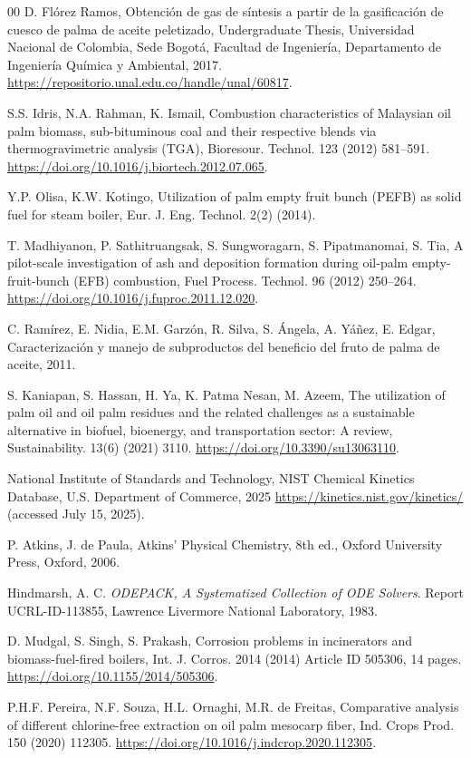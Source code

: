 \documentclass[preprint,12pt]{elsarticle}
\begin{document}
\begin{thebibliography}{00}
 D. Flórez Ramos, Obtención de gas de síntesis a partir de la gasificación de cuesco de palma de aceite peletizado, Undergraduate Thesis, Universidad Nacional de Colombia, Sede Bogotá, Facultad de Ingeniería, Departamento de Ingeniería Química y Ambiental, 2017. \url{https://repositorio.unal.edu.co/handle/unal/60817}.

 S.S. Idris, N.A. Rahman, K. Ismail, Combustion characteristics of Malaysian oil palm biomass, sub-bituminous coal and their respective blends via thermogravimetric analysis (TGA), Bioresour. Technol. 123 (2012) 581--591. \url{https://doi.org/10.1016/j.biortech.2012.07.065}.

 Y.P. Olisa, K.W. Kotingo, Utilization of palm empty fruit bunch (PEFB) as solid fuel for steam boiler, Eur. J. Eng. Technol. 2(2) (2014).

 T. Madhiyanon, P. Sathitruangsak, S. Sungworagarn, S. Pipatmanomai, S. Tia, A pilot-scale investigation of ash and deposition formation during oil-palm empty-fruit-bunch (EFB) combustion, Fuel Process. Technol. 96 (2012) 250--264. \url{https://doi.org/10.1016/j.fuproc.2011.12.020}.

 C. Ramírez, E. Nidia, E.M. Garzón, R. Silva, S. Ángela, A. Yáñez, E. Edgar, Caracterización y manejo de subproductos del beneficio del fruto de palma de aceite, 2011.

 S. Kaniapan, S. Hassan, H. Ya, K. Patma Nesan, M. Azeem, The utilization of palm oil and oil palm residues and the related challenges as a sustainable alternative in biofuel, bioenergy, and transportation sector: A review, Sustainability. 13(6) (2021) 3110. \url{https://doi.org/10.3390/su13063110}.

 National Institute of Standards and Technology, NIST Chemical Kinetics Database, U.S. Department of Commerce, 2025 \url{https://kinetics.nist.gov/kinetics/} (accessed July 15, 2025).

 P. Atkins, J. de Paula, Atkins' Physical Chemistry, 8th ed., Oxford University Press, Oxford, 2006.

Hindmarsh, A. C. \textit{ODEPACK, A Systematized Collection of ODE Solvers}. Report UCRL-ID-113855, Lawrence Livermore National Laboratory, 1983. 

 D. Mudgal, S. Singh, S. Prakash, Corrosion problems in incinerators and biomass-fuel-fired boilers, Int. J. Corros. 2014 (2014) Article ID 505306, 14 pages. \url{https://doi.org/10.1155/2014/505306}.

 P.H.F. Pereira, N.F. Souza, H.L. Ornaghi, M.R. de Freitas, Comparative analysis of different chlorine-free extraction on oil palm mesocarp fiber, Ind. Crops Prod. 150 (2020) 112305. \url{https://doi.org/10.1016/j.indcrop.2020.112305}.

\end{thebibliography}
\end{document}
